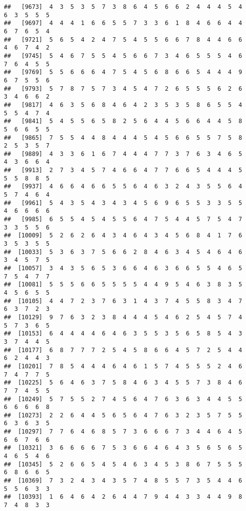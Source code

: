 \documentclass[
]{book}
\begin{document}
\begin{verbatim}
##   [9673]  4  3  5  3  5  7  3  8  6  4  5  6  6  2  4  4  4  5  4  6  3  5  5  5
##   [9697]  4  4  4  1  6  6  5  5  7  3  3  6  1  8  4  6  6  4  4  6  7  6  5  4
##   [9721]  5  6  5  4  2  4  7  5  4  5  5  6  6  7  8  4  4  6  6  4  6  7  4  2
##   [9745]  5  4  6  7  5  5  4  5  6  6  7  3  4  6  5  5  5  4  6  7  6  4  5  5
##   [9769]  5  5  6  6  6  4  7  5  4  5  6  8  6  6  5  4  4  4  9  6  7  5  5  6
##   [9793]  5  7  8  7  5  7  3  4  5  4  7  2  6  5  5  5  6  2  6  3  4  6  6  2
##   [9817]  4  6  3  5  6  8  4  6  4  2  3  5  3  5  8  6  5  5  4  5  5  4  7  4
##   [9841]  5  4  5  5  6  5  8  2  5  6  4  4  5  6  6  4  4  5  8  5  6  6  5  5
##   [9865]  7  5  5  4  4  8  4  4  4  5  4  5  6  6  5  5  7  5  8  2  5  3  5  7
##   [9889]  4  3  3  6  1  6  7  4  4  4  7  7  3  7  6  3  4  6  5  4  3  6  6  4
##   [9913]  2  7  3  4  5  7  4  6  6  4  7  7  6  6  5  4  4  4  5  5  5  8  8  5
##   [9937]  4  6  6  4  6  6  5  5  6  4  6  3  2  4  3  5  5  6  4  5  7  4  6  4
##   [9961]  5  4  3  5  4  3  4  3  4  5  6  9  6  5  5  3  3  5  5  4  6  6  6  6
##   [9985]  6  5  5  4  5  4  5  5  6  4  7  5  4  4  5  7  5  4  7  3  3  5  5  6
##  [10009]  5  2  6  2  6  4  3  4  6  4  3  4  5  6  8  4  1  7  6  3  5  3  5  5
##  [10033]  5  3  6  3  7  5  6  6  2  8  4  6  3  4  5  4  6  4  6  3  4  5  7  5
##  [10057]  3  4  3  5  6  5  3  6  6  4  6  3  6  6  5  5  4  6  5  7  5  4  7  7
##  [10081]  5  5  5  6  6  5  5  5  5  4  4  9  5  4  6  3  8  3  5  4  5  6  5  5
##  [10105]  4  4  7  2  3  7  6  3  1  4  3  7  4  5  5  8  3  4  7  6  3  7  2  3
##  [10129]  9  7  6  3  2  3  8  4  4  4  5  4  6  2  5  4  5  7  4  5  7  3  6  5
##  [10153]  6  4  4  4  4  6  4  6  3  5  5  3  5  6  5  8  5  4  3  3  7  4  4  5
##  [10177]  6  8  7  7  7  2  5  4  5  8  6  6  4  5  7  2  5  4  4  6  2  4  4  3
##  [10201]  7  8  5  4  4  4  6  4  6  1  5  7  4  5  5  5  2  4  6  7  4  7  7  5
##  [10225]  5  6  4  6  3  7  5  8  4  6  3  4  5  5  7  3  8  4  6  7  7  4  5  5
##  [10249]  5  7  5  5  2  7  4  5  6  4  7  6  3  6  3  4  4  5  5  6  6  6  6  8
##  [10273]  2  2  6  4  4  5  6  5  6  4  7  6  3  2  3  5  7  5  5  6  3  6  3  5
##  [10297]  7  7  6  4  6  8  5  7  3  6  6  6  7  3  4  4  6  4  5  6  6  7  6  6
##  [10321]  3  6  6  6  6  7  5  3  6  6  4  6  4  3  5  6  5  6  5  4  6  5  4  6
##  [10345]  5  2  6  6  5  4  5  4  6  3  4  5  3  8  6  7  5  5  5  6  8  6  6  5
##  [10369]  7  3  2  4  3  4  3  5  7  4  8  5  5  7  3  5  4  4  6  5  5  6  3  3
##  [10393]  1  6  4  6  4  2  6  4  4  7  9  4  4  3  3  4  4  9  8  7  4  8  3  3

\end{verbatim}
\end{document}
